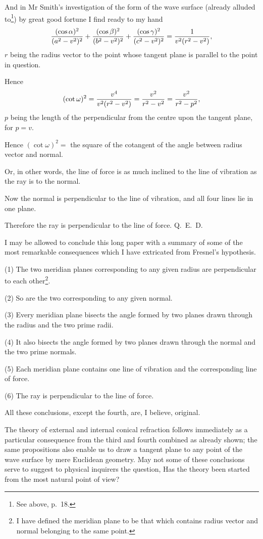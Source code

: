 \documentclass[11pt]{article}
\newcommand{\sourcepage}[1]{\marginpar{\scriptsize p.~#1}}
\begin{document}
\sourcepage{25}
And in Mr Smith's investigation of the form of the wave surface (already alluded to\footnote{See above, p.~18.}) by great good fortune I find ready to my hand
\[
 \frac{(\cos\alpha)^2}{(a^2-v^2)^2}
 +\frac{(\cos\beta)^2}{(b^2-v^2)^2}
 +\frac{(\cos\gamma)^2}{(c^2-v^2)^2}
 ={1\over v^2(r^2-v^2)},
\]
$r$ being the radius vector to the point whose tangent plane is parallel to the point in question.

Hence
\[
 (\cot\omega)^2={v^4\over v^2(r^2-v^2)}={v^2\over r^2-v^2}={v^2\over r^2-p^2},
\]
$p$ being the length of the perpendicular from the centre upon the tangent plane, for $p=v$.

Hence $(\cot\omega)^2=$ the square of the cotangent of the angle between radius vector and normal.

Or, in other words, the line of force is as much inclined to the line of vibration as the ray is to the normal.

Now the normal is perpendicular to the line of vibration, and all four lines lie in one plane.

Therefore the ray is perpendicular to the line of force. \qquad Q.~E.~D.

I may be allowed to conclude this long paper with a summary of some of the most remarkable consequences which I have extricated from Fresnel's hypothesis.

(1) The two meridian planes corresponding to any given radius are perpendicular to each other\footnote{I have defined the meridian plane to be that which contains radius vector and normal belonging to the same point.}.

(2) So are the two corresponding to any given normal.

(3) Every meridian plane bisects the angle formed by two planes drawn through the radius and the two prime radii.

(4) It also bisects the angle formed by two planes drawn through the normal and the two prime normals.

(5) Each meridian plane contains one line of vibration and the corresponding line of force.

(6) The ray is perpendicular to the line of force.

All these conclusions, except the fourth, are, I believe, original.

\sourcepage{26}
The theory of external and internal conical refraction follows immediately as a particular consequence from the third and fourth combined as already shown; the same propositions also enable us to draw a tangent plane to any point of the wave surface by mere Euclidean geometry. May not some of these conclusions serve to suggest to physical inquirers the question, Has the theory been started from the most natural point of view?
\end{document}

